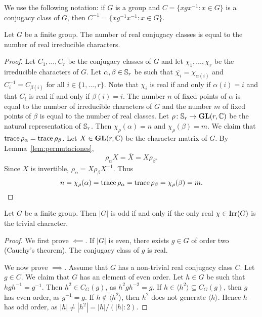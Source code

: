 We use the following notation: if $G$ is a group and $C=\{xgx^{-1}:x\in G\}$ is a conjugacy class of  
$G$, then $C^{-1}=\{xg^{-1}x^{-1}:x\in G\}$.  

\begin{theorem}[Burnside]
    Let $G$ be a finite group. The number of real conjugacy classes is equal 
    to the number of real irreducible characters. 
\end{theorem}

\begin{proof}
  Let $C_1,\dots,C_r$ be the conjugacy classes of $G$ and  
  let $\chi_1,\dots,\chi_r$ be the irreducible characters of $G$. 
  Let $\alpha,\beta\in\mathbb{S}_r$ be such that $\overline{\chi_i}=\chi_{\alpha(i)}$ and 
  $C_i^{-1}=C_{\beta(i)}$ for all $i\in\{1,\dots,r\}$. Note that $\chi_i$
  is real if and only if $\alpha(i)=i$ and that $C_i$ is real if and only if 
  $\beta(i)=i$. The number $n$ of fixed points of $\alpha$ is equal to the number
  of irreducible characters of $G$ and the number $m$ of fixed points of $\beta$ is equal
  to the number of real classes. 
  Let $\rho\colon\mathbb{S}_r\to\mathbf{GL}(r,\mathbb{C})$ be the natural representation of $\mathbb{S}_r$. Then
  $\chi_\rho(\alpha)=n$ and $\chi_\rho(\beta)=m$. We claim that 
  $\operatorname{trace}\rho_\alpha=\operatorname{trace}\rho_\beta$. 
  Let $X\in\mathbf{GL}(r,\mathbb{C})$ be the character matrix of $G$. 
  By Lemma~\ref{lem:permutaciones}, 
  \[
	\rho_\alpha X=\overline{X}=X\rho_\beta.
  \]
  Since $X$ is invertible, $\rho_{\alpha}=X\rho_{\beta}X^{-1}$. Thus 
  \[
    n=\chi_{\rho}(\alpha)=\operatorname{trace}\rho_{\alpha}=\operatorname{trace}\rho_{\beta}=\chi_{\rho}(\beta)=m.\qedhere
  \]
\end{proof}

\begin{corollary}
  \label{corollary:|G|impar}
  Let $G$ be a finite group. Then $|G|$ is odd if and only if
  the only real $\chi\in\operatorname{Irr}(G)$ is the trivial character. 
\end{corollary}

\begin{proof}
    We first prove $\impliedby$. If $|G|$ is even, there exists 
    $g\in G$ of order two (Cauchy's theorem). The conjugacy class of $g$ 
    is real. 

    We now prove $\implies$. Assume that $G$ has a non-trivial 
    real conjugacy class $C$. Let $g\in C$. We claim that 
    $G$ has an element of even order. Let $h\in G$ be such that
    $hgh^{-1}=g^{-1}$. Then $h^2\in C_G(g)$, as $h^2gh^{-2}=g$. 
    If $h\in\langle h^2\rangle\subseteq C_G(g)$, then $g$ has 
    even order, as $g^{-1}=g$. If $h\not\in\langle h^2\rangle$, then 
    $h^2$ does not generate $\langle h\rangle$. Hence $h$ has odd order, 
    as $|h|\ne|h^2|=|h|/(|h|:2)$.  
\end{proof}

